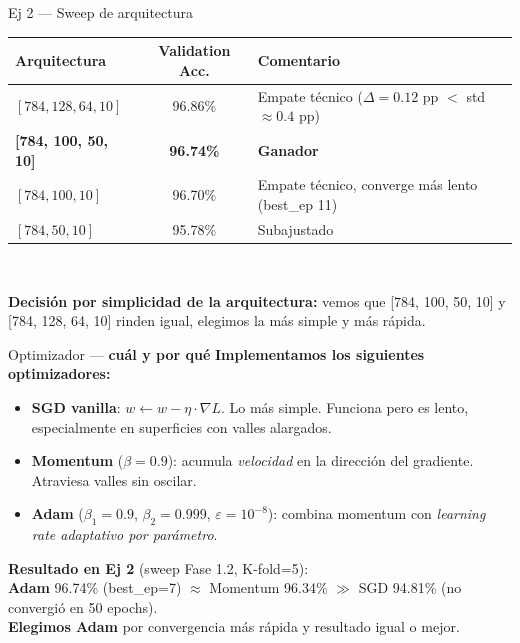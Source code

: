 \documentclass[11pt,aspectratio=169]{beamer}
\begin{document}
\begin{frame}{Ej 2 — Sweep de arquitectura}
\centering\footnotesize
\begin{tabular}{@{}lcl@{}}
\toprule
\textbf{Arquitectura} & \textbf{Validation Acc.} & \textbf{Comentario} \\
\midrule
$[784, 128, 64, 10]$               & 96.86\% & Empate técnico ($\Delta = 0.12$ pp $<$ std $\approx 0.4$ pp) \\
\rowcolor{accent2!15}
\textbf{[784, 100, 50, 10]}        & \textbf{96.74\%} & \textbf{Ganador} \\
$[784, 100, 10]$                   & 96.70\% & Empate técnico, converge más lento (best\_ep 11) \\
$[784, 50, 10]$                    & 95.78\% & Subajustado \\
\bottomrule
\end{tabular}\\[0.8em]

\begin{takeaway}
\textbf{Decisión por simplicidad de la arquitectura:} vemos que [784, 100, 50, 10] y [784, 128, 64, 10] rinden igual, elegimos la más simple y más rápida.
\end{takeaway}
\end{frame}

\begin{frame}{Optimizador — \textbf{cuál y por qué}}
\textbf{Implementamos los siguientes optimizadores:}\\[0.6em]

\begin{itemize}\setlength\itemsep{0.25em}\small
  \item \textbf{SGD vanilla}: $w \leftarrow w - \eta \cdot \nabla L$. Lo más simple. Funciona pero es lento, especialmente en superficies con valles alargados.
  \item \textbf{Momentum} ($\beta = 0.9$): acumula \emph{velocidad} en la dirección del gradiente. Atraviesa valles sin oscilar.
  \item \textbf{Adam} ($\beta_1 = 0.9$, $\beta_2 = 0.999$, $\varepsilon = 10^{-8}$): combina momentum con \emph{learning rate adaptativo por parámetro}.
\end{itemize}
\vspace{0.6em}

\begin{takeaway}
\textbf{Resultado en Ej 2} (sweep Fase 1.2, K-fold=5): \\
\textbf{Adam} 96.74\% (best\_ep=7) \quad $\approx$ \quad Momentum 96.34\% \quad $\gg$ \quad SGD 94.81\% (no convergió en 50 epochs).\\[0.2em]
\textbf{Elegimos Adam} por convergencia más rápida y resultado igual o mejor.
\end{takeaway}
\end{frame}
\end{document}
